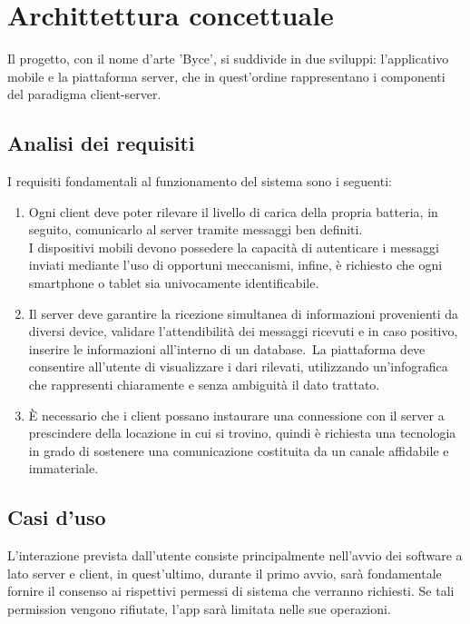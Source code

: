 \documentclass[target=bach]{thud}
\begin{document}
\chapter{Archittettura concettuale}
    Il progetto, con il nome d'arte 'Byce', si suddivide in due sviluppi: l'applicativo mobile e la piattaforma server, che in quest'ordine rappresentano i componenti del paradigma client-server.

\section{Analisi dei requisiti}
    I requisiti fondamentali al funzionamento del sistema sono i seguenti:

    \begin{enumerate}
        \item Ogni client deve poter rilevare il livello di carica della propria batteria, in seguito, comunicarlo al server tramite messaggi ben definiti.\\
        I dispositivi mobili devono possedere la capacità di autenticare i messaggi inviati mediante l'uso di opportuni meccanismi, infine, è richiesto che ogni smartphone o tablet sia univocamente identificabile.

        \item Il server deve garantire la ricezione simultanea di informazioni provenienti da diversi device, validare l'attendibilità dei messaggi ricevuti e in caso positivo, inserire le informazioni all'interno di un database.\
        La piattaforma deve consentire all'utente di visualizzare i dari rilevati, utilizzando un'infografica che rappresenti chiaramente e senza ambiguità il dato trattato.

        \item \`E necessario che i client possano instaurare una connessione con il server a prescindere della locazione in cui si trovino, quindi è richiesta una tecnologia in grado di sostenere una comunicazione costituita da un canale affidabile e immateriale.
    \end{enumerate}


\section{Casi d'uso}

    L'interazione prevista dall'utente consiste principalmente nell'avvio dei software a lato server e client, in quest'ultimo, durante il primo avvio, sarà fondamentale fornire il consenso ai rispettivi permessi di sistema che verranno richiesti. Se tali permission vengono rifiutate, l'app sarà limitata nelle sue operazioni.\
\end{document}
